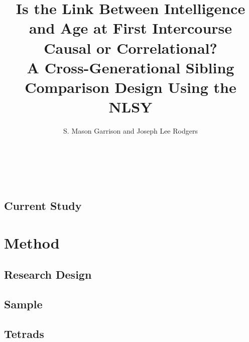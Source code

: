 \documentclass[a4paper,man,apacite,natbib,12pt,longtable]{apa6}\usepackage[]{graphicx}\usepackage[]{color}
\title{Is the Link Between Intelligence and Age at First Intercourse Causal or Correlational? \\ A Cross-Generational Sibling Comparison Design Using the NLSY}
\author{S. Mason Garrison and Joseph Lee Rodgers}
\affiliation{Vanderbilt University}
\begin{document}
\maketitle
%











\section{ }\vspace{-.8cm}
\\


\\

\subsection{Current Study}


\section{Method}
\subsection{Research Design}

%
\subsection{Sample}

%
\subsection{Tetrads}

%
\end{document}

